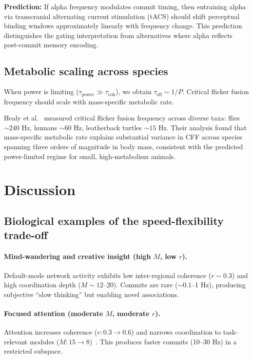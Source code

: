 \documentclass[12pt]{article}
\begin{document}
\textbf{Prediction:} If alpha frequency modulates commit timing, then entraining alpha via transcranial alternating current stimulation (tACS) should shift perceptual binding windows approximately linearly with frequency change. This prediction distinguishes the gating interpretation from alternatives where alpha reflects post-commit memory encoding.

\subsection{Metabolic scaling across species}

When power is limiting ($\tau_{\mathrm{power}} \gg \tau_{\mathrm{coh}}$), we obtain $\tau_{\mathrm{eff}} \sim 1/P$. Critical flicker fusion frequency should scale with mass-specific metabolic rate.

Healy et al.~\cite{healy2013} measured critical flicker fusion frequency across diverse taxa: flies $\sim 240$ Hz, humans $\sim 60$ Hz, leatherback turtles $\sim 15$ Hz. Their analysis found that mass-specific metabolic rate explains substantial variance in CFF across species spanning three orders of magnitude in body mass, consistent with the predicted power-limited regime for small, high-metabolism animals.

\section{Discussion}

\subsection{Biological examples of the speed-flexibility trade-off}

\paragraph{Mind-wandering and creative insight (high $M$, low $r$).}
Default-mode network activity exhibits low inter-regional coherence ($r \sim 0.3$) and high coordination depth ($M \sim 12$--20). Commits are rare ($\sim 0.1$--1 Hz), producing subjective ``slow thinking'' but enabling novel associations.

\paragraph{Focused attention (moderate $M$, moderate $r$).}
Attention increases coherence ($r: 0.3 \to 0.6$) and narrows coordination to task-relevant modules ($M: 15 \to 8$)~\cite{fries2015}. This produces faster commits (10--30 Hz) in a restricted subspace.
\end{document}
